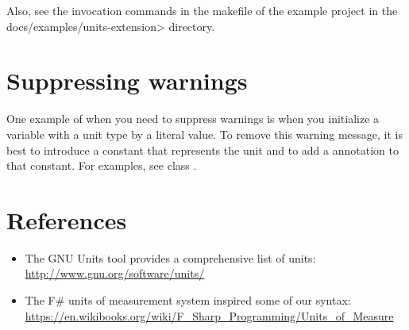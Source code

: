 Also, see the invocation commands in the makefile of the example project in the
\<docs/examples/units-extension> directory.

\section{Suppressing warnings\label{units-suppressing}}

One example of when you need to suppress warnings is when you initialize a
variable with a unit type by a literal value. To remove this warning message, it
is best to introduce a constant that represents the unit and to add a
 annotation to that constant. For examples, see class
.

\section{References\label{units-references}}

\begin{itemize}
\item The GNU Units tool provides a comprehensive list of units:\\
  \url{http://www.gnu.org/software/units/}

\item The F\# units of measurement system inspired some of our syntax:\\
  \url{https://en.wikibooks.org/wiki/F_Sharp_Programming/Units_of_Measure}

\end{itemize}
